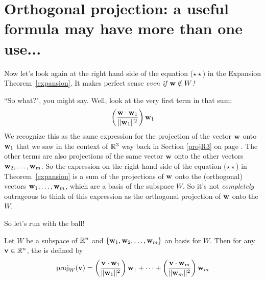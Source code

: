 
\section{Orthogonal projection: a useful formula may have more than one use...}

Now let's look again at the right hand side of the equation ($\star\star$) in the Expansion Theorem~\ref{expansion}. It makes perfect sense {\it even if $\mathbf{w} \notin W$!} 

``So what?", you might say. Well, look at the very first term in that sum: $$\left( \frac{  \mathbf{w} \cdot\mathbf{w}_1}{\Vert \mathbf{w}_1 \Vert^2} \right) \mathbf{w}_1$$ We recognize this as the same expression for the projection of the vector $\mathbf{w}$ onto $\mathbf{w}_1$ that we saw in the context of  $\mathbb{R}^3$ way back in Section \ref{projR3} on page \pageref{projR3}. The other terms are also projections of the same vector $\mathbf{w}$ onto the other vectors $\mathbf{w}_2, \dots, \mathbf{w}_m$. So the expression on the right hand side of the equation ($\star\star$) in Theorem~\ref{expansion} is a sum of the projections of $\mathbf{w}$ onto the (orthogonal) vectors $\mathbf{w}_1, \dots, \mathbf{w}_m$, which are a basis of the subspace $W$.  So it's not {\it completely} outrageous to think of this   expression as  the orthogonal projection of $\mathbf{w}$ onto the  $W$.

So let's run with the ball!




\begin{definition}\label{projdef}
Let $W$ be a subspace of $\mathbb{R}^n$ and $\{ \mathbf{w}_1,\mathbf{w}_2, \ldots, \mathbf{w}_m\}$ 
an  basis for $W$.    
Then for any $\mathbf{v} \in \mathbb{R}^n$, the  is defined by
$$
\operatorname{proj}_W(\mathbf{v}) = \left(\frac{\mathbf{v}\cdot \mathbf{w}_1}{\Vert \mathbf{w}_1\Vert^2}\right) \mathbf{w}_1 + \cdots 
+ 
\left(\frac{\mathbf{v}\cdot \mathbf{w}_m}{\Vert \mathbf{w}_m\Vert^2}\right)\mathbf{w}_m
$$
\end{definition}

